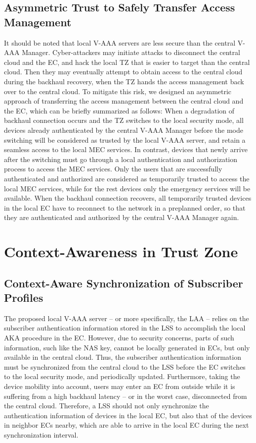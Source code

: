 \documentclass{ieeeaccess}
\newcommand{\change}[1]{#1}
\begin{document}
	\subsection{Asymmetric Trust to Safely Transfer Access Management}\label{subsec:asymmetric_trust}
	It should be noted that local V-AAA servers are less secure than the central V-AAA Manager\change{. Cyber-attackers} may initiate attacks to disconnect the central cloud and the EC, and hack the local TZ that is easier to target than the central cloud. Then they may eventually attempt to obtain access to the central cloud during the backhaul recovery, when the TZ hands the access management back over to the central cloud. To mitigate this risk, we designed an asymmetric approach of transferring the access management between the central cloud and the EC, which can be briefly summarized as follows: When a degradation of backhaul connection occurs and the TZ switches to the local security mode, all devices already authenticated by the central V-AAA Manager before the mode switching will be considered as trusted by the local V-AAA server, and retain a seamless access to the local MEC services. In contrast, devices that newly arrive after the switching must go through a local authentication and authorization process to access the MEC services. Only the users that are successfully authenticated and authorized are considered as temporarily trusted to access the local MEC services, while for the rest devices only the emergency services will be available. When the backhaul connection recovers, all temporarily trusted devices in the local EC have to reconnect to the network in a preplanned order, so that they are authenticated and authorized by the central V-AAA Manager again.
	
	\section{Context-Awareness in Trust Zone}
	\subsection{Context-Aware Synchronization of Subscriber Profiles}\label{subsec:sync}
	The proposed local V-AAA server -- or more specifically, the LAA -- relies on the subscriber authentication information stored in the LSS to accomplish the local AKA procedure in the EC. However, due to security concerns, parts of such information, such like the NAS key, cannot be locally generated in ECs, but only available in the central cloud. Thus, the subscriber authentication information must be synchronized from the central cloud to the LSS before the EC switches to the local security mode, and periodically updated. Furthermore, taking the device mobility into account, users may enter an EC from \change{outside} while it is \change{suffering from a high backhaul latency -- or in the worst case, }disconnected from the central cloud. Therefore, a LSS should not only synchronize the authentication information of devices in the local EC, but also that of the devices in neighbor ECs nearby, which are able to arrive in the local EC during the next synchronization interval. 
	
\end{document}
